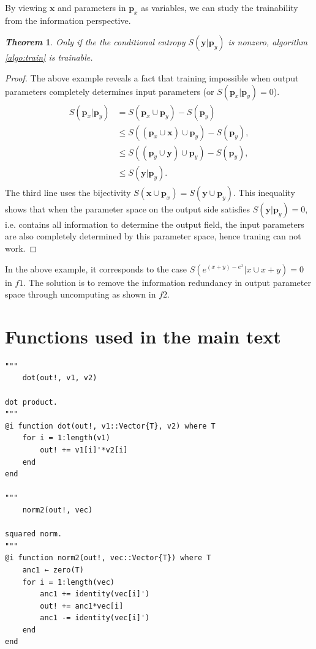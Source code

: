 \documentclass[aps,twocolumn,longbibliography,english,superscriptaddress]{revtex4-1}
\newcommand{\<}{\langle}
\renewcommand{\>}{\rangle}
\newcommand{\vx}{{\mathbf{x}}}
\newcommand{\vp}{{\mathbf{p}}}
\newcommand{\vy}{{\mathbf{y}}}
\newtheorem{theorem}{\textit{Theorem}}
\theoremstyle{definition}\newtheorem{definition}{\textit{Definition}}
\begin{document}
By viewing $\vx$ and parameters in $\vp_x$ as variables, we can study the trainability from the information perspective.
\begin{theorem}
    Only if the the conditional entropy $S(\vy|\vp_y)$ is nonzero, algorithm \ref{algo:train} is trainable.
\end{theorem}
\begin{proof}
The above example reveals a fact that training impossible when output parameters completely determines input parameters (or $S(\vp_x | \vp_y) = 0$).
\begin{align}
    \begin{split}
        S(\vp_x | \vp_y) &= S(\vp_x \cup \vp_y) - S(\vp_y)\\
        &\leq S\left((\vp_x \cup \vx) \cup \vp_y \right) - S(\vp_y),\\
        &\leq S\left((\vp_y \cup \vy) \cup \vp_y\right) - S(\vp_y),\\
    &\leq S(\vy|\vp_y).
    \end{split}
\end{align}
The third line uses the bijectivity $S(\vx \cup \vp_x) = S(\vy \cup \vp_y)$.
This inequality shows that when the parameter space on the output side satisfies $S(\vy | \vp_y) = 0$, i.e. contains all information to determine the output field, the input parameters are also completely determined by this parameter space, hence traning can not work.
\end{proof}
In the above example, it corresponds to the case $S\left(e^{(x+y)-e^x} | x \cup x + y\right) = 0$ in $f1$.
The solution is to remove the information redundancy in output parameter space through uncomputing as shown in $f2$.

\section{Functions used in the main text}\label{app:functions}

\begin{minipage}{.44\textwidth}
\begin{lstlisting}
"""
    dot(out!, v1, v2)

dot product.
"""
@i function dot(out!, v1::Vector{T}, v2) where T
    for i = 1:length(v1)
        out! += v1[i]'*v2[i]
    end
end

"""
    norm2(out!, vec)

squared norm.
"""
@i function norm2(out!, vec::Vector{T}) where T
    anc1 ← zero(T)
    for i = 1:length(vec)
        anc1 += identity(vec[i]')
        out! += anc1*vec[i]
        anc1 -= identity(vec[i]')
    end
end
\end{lstlisting}
\end{minipage}
\end{document}
